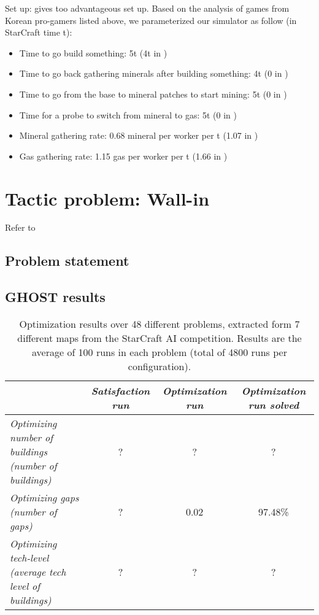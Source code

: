 \documentclass[journal]{IEEEtran}
\newcommand{\ghost}{\textsc{GHOST}\xspace}
\begin{document}
Set up: \cite{ChurchillB11} gives too advantageous set up. Based on the analysis of games from Korean pro-gamers listed above, we parameterized our simulator as follow (in StarCraft time t):
\begin{itemize}
\item Time to go build something: 5t (4t in \cite{ChurchillB11})
\item Time to go back gathering minerals after building something: 4t (0 in \cite{ChurchillB11})
\item Time to go from the base to mineral patches to start mining: 5t (0 in \cite{ChurchillB11})
\item Time for a probe to switch from mineral to gas: 5t (0 in \cite{ChurchillB11})
\item Mineral gathering rate: 0.68 mineral per worker per t (1.07 in \cite{ChurchillB11})
\item Gas gathering rate: 1.15 gas per worker per t (1.66 in \cite{ChurchillB11})
\end{itemize}  

\section{Tactic problem: Wall-in}\label{sec:wall}
Refer to \cite{Certicky13, RichouxUO14}
\subsection{Problem statement}
\subsection{\ghost results}

\begin{table*}[tba]
    \centering
    \caption{Optimization results over 48 different problems, extracted form 7 different maps from the StarCraft AI competition. Results are the average of 100 runs in each problem (total of 4800 runs per configuration).}
    \begin{tabular}{|l|c|c|c|} \hline
    \label{tbl:wall}
									& {\em Satisfaction run}& {\em Optimization run}& {\em Optimization run solved} \\
                                                                        \hline
    	{\em Optimizing number of buildings (number of buildings)} 	& ?                  & ?                  & ? \\ 
    	{\em Optimizing gaps (number of gaps)} 				& ?                  & 0.02                  & 97.48\%  \\ 
    	{\em Optimizing tech-level (average tech level of buildings)} 	& ?                  & ?                  & ?  \\
        \hline
    \end{tabular}  
\end{table*}
\end{document}
